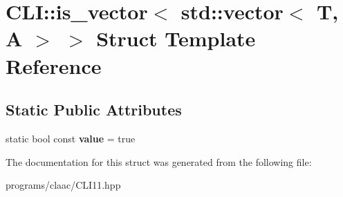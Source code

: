\hypertarget{struct_c_l_i_1_1is__vector_3_01std_1_1vector_3_01_t_00_01_a_01_4_01_4}{}\section{C\+LI\+:\+:is\+\_\+vector$<$ std\+:\+:vector$<$ T, A $>$ $>$ Struct Template Reference}
\label{struct_c_l_i_1_1is__vector_3_01std_1_1vector_3_01_t_00_01_a_01_4_01_4}
\subsection*{Static Public Attributes}
\begin{DoxyCompactItemize}
\item 
\mbox{\label{struct_c_l_i_1_1is__vector_3_01std_1_1vector_3_01_t_00_01_a_01_4_01_4_a3f57ff1f33bc35ee4d817047932307f0}} 
static bool const {\bfseries value} = true
\end{DoxyCompactItemize}


The documentation for this struct was generated from the following file\+:\begin{DoxyCompactItemize}
\item 
programs/claac/C\+L\+I11.\+hpp\end{DoxyCompactItemize}
